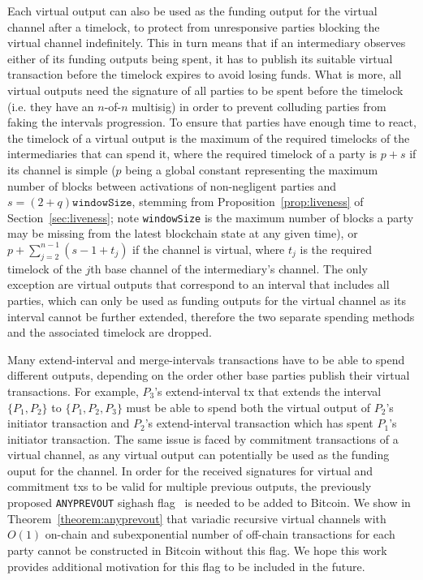   Each virtual output can also be used as the funding output for the virtual
  channel after a timelock, to protect from unresponsive parties blocking the
  virtual channel indefinitely. This in turn means that if an intermediary
  observes either of its funding outputs being spent, it has to publish its
  suitable virtual transaction before the timelock expires to avoid losing
  funds. What is more, all virtual outputs need the signature of all parties to
  be spent before the timelock (i.e. they have an $n$-of-$n$ multisig) in order
  to prevent colluding parties from faking the intervals progression. To ensure
  that parties have enough time to react, the timelock of a virtual output is
  the maximum of the required timelocks of the intermediaries that can spend it,
  where the required timelock of a party is $p + s$ if its channel is simple
  ($p$ being a global constant representing the maximum number of blocks between
  activations of non-negligent parties and $s = (2 + q)\texttt{windowSize}$,
  stemming from Proposition~\ref{prop:liveness} of Section~\ref{sec:liveness}; note
  \texttt{windowSize} is the maximum number of blocks a party may be missing
  from the latest blockchain state at any given time),  or $p +
  \sum\limits_{j = 2}^{n - 1}(s - 1 + t_j)$ if the channel is virtual, where $t_j$ is the required timelock of the $j$th base channel
  of the intermediary's channel. The only exception are virtual outputs that
  correspond to an interval that includes all parties, which can only be used as
  funding outputs for the virtual channel as its interval cannot be further
  extended, therefore the two separate spending methods and the associated
  timelock are dropped.

  Many extend-interval and merge-intervals transactions have to be able to spend
  different outputs, depending on the order other base parties publish their
  virtual transactions. For example, $P_3$'s extend-interval tx that extends the
  interval $\{P_1, P_2\}$ to $\{P_1, P_2, P_3\}$ must be able to spend both
  the virtual output of $P_2$'s initiator transaction and $P_2$'s
  extend-interval transaction which has spent $P_1$'s initiator transaction. The
  same issue is faced by commitment transactions of a virtual channel, as any
  virtual output can potentially be used as the funding ouput for the channel.
  In order for the received signatures for virtual and commitment txs to be
  valid for multiple previous outputs, the previously proposed
  \texttt{ANYPREVOUT} sighash flag~\cite{anyprevout} is needed to be added to
  Bitcoin. We show in Theorem~\ref{theorem:anyprevout} that variadic recursive
  virtual channels with $O(1)$ on-chain and subexponential number of off-chain
  transactions for each party cannot be constructed in Bitcoin without this
  flag. We hope this work provides additional motivation for this flag to be
  included in the future.

